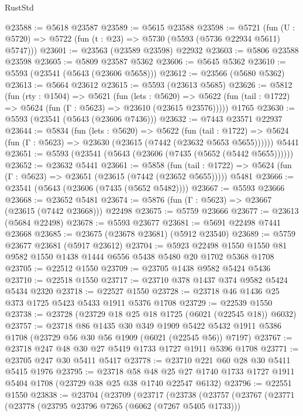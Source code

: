 \begin{lexlean}{RustStd}
\begin{coremodule}
@23588 := @5618 @23587
@23589 := @5615 @23588
@23598 := @5721
    (fun (U : @5720) => @5722 (fun (t : @23) => @5730 (@5593 (@5736 @22934 @5611) @5747)))
@23601 := @23563 (@23589 @23598) @22932
@23603 := @5806 @23588 @23598
@23605 := @5809 @23587 @5362
@23606 := @5645 @5362
@23610 := @5593 (@23541 (@5643 (@23606 @5658)))
@23612 := @23566 (@5680 @5362)
@23613 := @5664 @23612
@23615 := @5593 (@23613 @5685)
@23626 := @5812
    (fun (rty : @1504) =>
    @5621
      (fun (lets : @5620) =>
      @5622 (fun (tail : @1722) => @5624 (fun (Γ : @5623) => @23610 (@23615 @23576)))))
    @1765
@23630 := @5593 (@23541 (@5643 (@23606 @7436)))
@23632 := @7443 @23571 @22937
@23644 := @5834
    (fun (lets : @5620) =>
    @5622
      (fun (tail : @1722) =>
      @5624 (fun (Γ : @5623) => @23630 (@23615 (@7442 (@23632 @5653 @5655))))))
    @5441
@23651 := @5593 (@23541 (@5643 (@23606 (@7435 (@5652 (@5442 @5655))))))
@23652 := @23632 @5441
@23661 := @5858
    (fun (tail : @1722) => @5624 (fun (Γ : @5623) => @23651 (@23615 (@7442 (@23652 @5655)))))
    @5481
@23666 := @23541 (@5643 (@23606 (@7435 (@5652 @5482))))
@23667 := @5593 @23666
@23668 := @23652 @5481
@23674 := @5876 (fun (Γ : @5623) => @23667 (@23615 (@7442 @23668))) @22498
@23675 := @5759 @23666
@23677 := @23613 (@5684 @22498)
@23678 := @5593 @23677
@23681 := @5691 @22498 @7441 @23668
@23685 := @23675 (@23678 @23681) (@5912 @23540)
@23689 := @5759 @23677 @23681 (@5917 @23612)
@23704 := @5923
    @22498
    @1550
    @1550
    @81
    @9582
    @1550
    @1438
    @1444
    @6556
    @5438
    @5480
    @20
    @1702
    @5368
    @1708
@23705 := @22512 @1550
@23709 := @23705 @1438 @9582 @5424 @5436
@23710 := @22518 @1550
@23717 := @23710 @378 @1437 @374 @9582 @5424 @5434 @2320
@23718 := @22527 @1550
@23728 := @23718 @46 @1436 @25 @373 @1725 @5423 @5433 @1911 @5376 @1708
@23729 := @22539 @1550
@23738 := @23728 (@23729 @18 @25 @18 @1725 (@6021 (@22545 @18)) @6032)
@23757 := @23718
    @86
    @1435
    @30
    @349
    @1909
    @5422
    @5432
    @1911
    @5386
    @1708
    (@23729 @56 @30 @56 @1909 (@6021 (@22545 @56)) @7197)
@23767 := @23718 @247 @48 @30 @27 @5419 @1733 @1727 @1911 @5396 @1708
@23771 := @23705 @247 @30 @5411 @5417
@23778 := @23710 @221 @60 @28 @30 @5411 @5415 @1976
@23795 := @23718
    @58
    @48
    @25
    @27
    @1740
    @1733
    @1727
    @1911
    @5404
    @1708
    (@23729 @38 @25 @38 @1740 @22547 @6132)
@23796 := @22551 @1550
@23838 := @23704
    (@23709
      (@23717
        (@23738
          (@23757
            (@23767
              (@23771
                (@23778
                  (@23795 @23796 @7265 (@6062 (@7267 @5405 @1733)))

\end{coremodule}
\end{lexlean}
